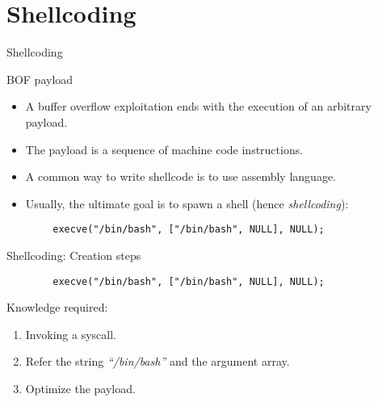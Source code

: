 \section{Shellcoding}
\begin{frame}[fragile]{Shellcoding}
	\begin{block}{BOF payload}
		\begin{itemize}
			\item A buffer overflow exploitation ends with the execution of an arbitrary payload.
			\item The payload is a sequence of machine code instructions.
			\item A common way to write shellcode is to use assembly language.
			\item Usually, the ultimate goal is to spawn a shell (hence \emph{shellcoding}):
		\end{itemize}
	\end{block}
	\ccode
	\begin{lstlisting}
		execve("/bin/bash", ["/bin/bash", NULL], NULL);
	\end{lstlisting}
\end{frame}

\begin{frame}[fragile]{Shellcoding: Creation steps}
	\ccode
	\begin{lstlisting}
		execve("/bin/bash", ["/bin/bash", NULL], NULL);
	\end{lstlisting}
	\begin{block}{Knowledge required:}
		\begin{enumerate}
			\item Invoking a syscall.
			\item Refer the string \emph{``/bin/bash''} and the argument array.
			\item Optimize the payload.
		\end{enumerate}
	\end{block}
\end{frame}

